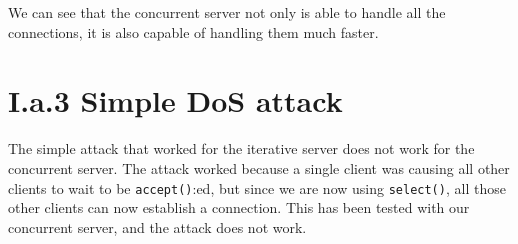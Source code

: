 \documentclass{article}
\begin{document}
We can see that the concurrent server not only is able to handle all the connections, it is also capable of handling them much faster.

\section*{I.a.3 Simple DoS attack}
The simple attack that worked for the iterative server does not work for the concurrent server. The attack worked because a single client was causing all other clients to wait to be \texttt{accept()}:ed, but since we are now using \texttt{select()}, all those other clients can now establish a connection. This has been tested with our concurrent server, and the attack does not work.
\end{document}
